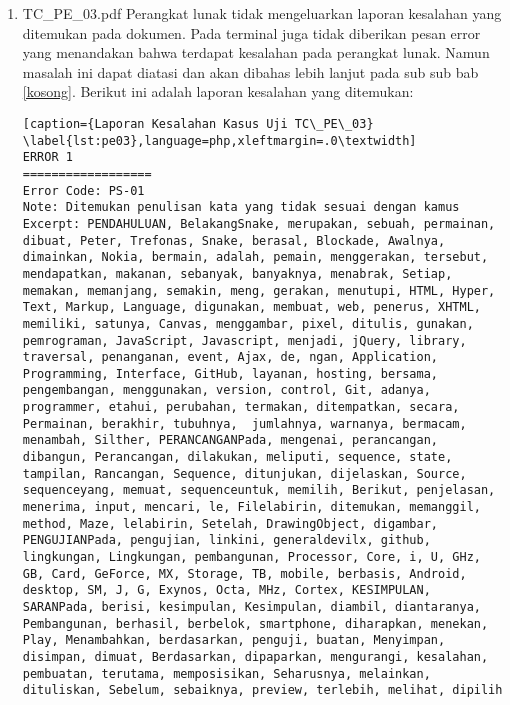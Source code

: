 \begin{enumerate}
	\item TC\_PE\_03.pdf \newline
	Perangkat lunak tidak mengeluarkan laporan kesalahan yang ditemukan pada dokumen. Pada terminal juga tidak diberikan pesan error yang menandakan bahwa terdapat kesalahan pada perangkat lunak. Namun masalah ini dapat diatasi dan akan dibahas lebih lanjut pada sub sub bab \ref{kosong}. Berikut ini adalah laporan kesalahan yang ditemukan:

\begin{lstlisting}[caption={Laporan Kesalahan Kasus Uji TC\_PE\_03}	\label{lst:pe03},language=php,xleftmargin=.0\textwidth]
ERROR 1
==================
Error Code: PS-01
Note: Ditemukan penulisan kata yang tidak sesuai dengan kamus
Excerpt: PENDAHULUAN, BelakangSnake, merupakan, sebuah, permainan, dibuat, Peter, Trefonas, Snake, berasal, Blockade, Awalnya, dimainkan, Nokia, bermain, adalah, pemain, menggerakan, tersebut, mendapatkan, makanan, sebanyak, banyaknya, menabrak, Setiap, memakan, memanjang, semakin, meng, gerakan, menutupi, HTML, Hyper, Text, Markup, Language, digunakan, membuat, web, penerus, XHTML, memiliki, satunya, Canvas, menggambar, pixel, ditulis, gunakan, pemrograman, JavaScript, Javascript, menjadi, jQuery, library, traversal, penanganan, event, Ajax, de, ngan, Application, Programming, Interface, GitHub, layanan, hosting, bersama, pengembangan, menggunakan, version, control, Git, adanya, programmer, etahui, perubahan, termakan, ditempatkan, secara, Permainan, berakhir, tubuhnya,  jumlahnya, warnanya, bermacam, menambah, Silther, PERANCANGANPada, mengenai, perancangan, dibangun, Perancangan, dilakukan, meliputi, sequence, state, tampilan, Rancangan, Sequence, ditunjukan, dijelaskan, Source, sequenceyang, memuat, sequenceuntuk, memilih, Berikut, penjelasan, menerima, input, mencari, le, Filelabirin, ditemukan, memanggil, method, Maze, lelabirin, Setelah, DrawingObject, digambar, PENGUJIANPada, pengujian, linkini, generaldevilx, github, lingkungan, Lingkungan, pembangunan, Processor, Core, i, U, GHz, GB, Card, GeForce, MX, Storage, TB, mobile, berbasis, Android, desktop, SM, J, G, Exynos, Octa, MHz, Cortex, KESIMPULAN, SARANPada, berisi, kesimpulan, Kesimpulan, diambil, diantaranya, Pembangunan, berhasil, berbelok, smartphone, diharapkan, menekan, Play, Menambahkan, berdasarkan, penguji, buatan, Menyimpan, disimpan, dimuat, Berdasarkan, dipaparkan, mengurangi, kesalahan, pembuatan, terutama, memposisikan, Seharusnya, melainkan, dituliskan, Sebelum, sebaiknya, preview, terlebih, melihat, dipilih


\end{lstlisting}
\end{enumerate}
